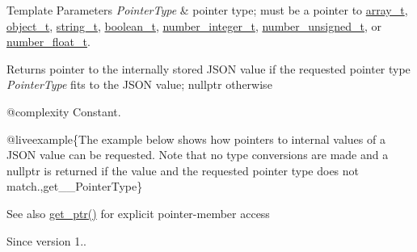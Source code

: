 \begin{DoxyTemplParams}{Template Parameters}
{\em Pointer\+Type} & pointer type; must be a pointer to \mbox{\hyperlink{classnlohmann_1_1basic__json_ae095578e03df97c5b3991787f1056374}{array\+\_\+t}}, \mbox{\hyperlink{classnlohmann_1_1basic__json_aa1eb13d5aa86f80cbee6c58e90fbaf49}{object\+\_\+t}}, \mbox{\hyperlink{classnlohmann_1_1basic__json_a61f8566a1a85a424c7266fb531dca005}{string\+\_\+t}}, \mbox{\hyperlink{classnlohmann_1_1basic__json_a4c919102a9b4fe0d588af64801436082}{boolean\+\_\+t}}, \mbox{\hyperlink{classnlohmann_1_1basic__json_a98e611d67b7bd75307de99c9358ab2dc}{number\+\_\+integer\+\_\+t}}, \mbox{\hyperlink{classnlohmann_1_1basic__json_ab906e29b5d83ac162e823ada2156b989}{number\+\_\+unsigned\+\_\+t}}, or \mbox{\hyperlink{classnlohmann_1_1basic__json_a88d6103cb3620410b35200ee8e313d97}{number\+\_\+float\+\_\+t}}.\\
\hline
\end{DoxyTemplParams}
\begin{DoxyReturn}{Returns}
pointer to the internally stored J\+S\+ON value if the requested pointer type {\itshape Pointer\+Type} fits to the J\+S\+ON value; {\ttfamily nullptr} otherwise
\end{DoxyReturn}
@complexity Constant.

@liveexample\{The example below shows how pointers to internal values of a J\+S\+ON value can be requested. Note that no type conversions are made and a {\ttfamily nullptr} is returned if the value and the requested pointer type does not match.,get\+\_\+\+\_\+\+Pointer\+Type\}

\begin{DoxySeeAlso}{See also}
\mbox{\hyperlink{classnlohmann_1_1basic__json_aefa46bd2d96bb77a38d1c8b431eab44f}{get\+\_\+ptr()}} for explicit pointer-\/member access
\end{DoxySeeAlso}
\begin{DoxySince}{Since}
version 1.. 
\end{DoxySince}
\mbox{\label{classnlohmann_1_1basic__json_af4ac14224fbdd29d3547fcb11bb55c8f}} 
